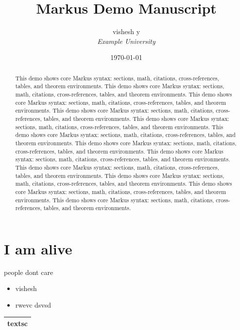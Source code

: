 \documentclass[11pt,a4paper]{article}
\title{Markus Demo Manuscript}
\author{vishesh y\\
\textit{Example University}}
\date{\today}
\begin{document}
\maketitle
\begin{abstract}
This demo shows core Markus syntax: sections, math, citations,
cross-references, tables, and theorem environments.
  This demo shows core Markus syntax: sections, math, citations,
cross-references, tables, and theorem environments.  This demo shows core Markus syntax: sections, math, citations,
cross-references, tables, and theorem environments.  This demo shows core Markus syntax: sections, math, citations,
cross-references, tables, and theorem environments.  This demo shows core Markus syntax: sections, math, citations,
cross-references, tables, and theorem environments.  This demo shows core Markus syntax: sections, math, citations,
cross-references, tables, and theorem environments.  This demo shows core Markus syntax: sections, math, citations,
cross-references, tables, and theorem environments.  This demo shows core Markus syntax: sections, math, citations,
cross-references, tables, and theorem environments.  This demo shows core Markus syntax: sections, math, citations,
cross-references, tables, and theorem environments.  This demo shows core Markus syntax: sections, math, citations,
cross-references, tables, and theorem environments.  This demo shows core Markus syntax: sections, math, citations,
cross-references, tables, and theorem environments.  This demo shows core Markus syntax: sections, math, citations,
cross-references, tables, and theorem environments.
\end{abstract}

\section{I am alive}

people dont care

\begin{itemize}
  \item vishesh
  \item rwevc dsvsd
\end{itemize}

\begin{table}[!t]
\centering
\begin{tabular}{l}
\hline
textsc \\
\hline

\hline
\end{tabular}
\end{table}
\end{document}
